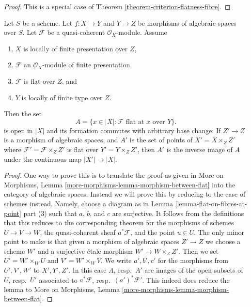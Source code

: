 \begin{proof}
This is a special case of
Theorem \ref{theorem-criterion-flatness-fibre}.
\end{proof}

\begin{lemma}
\label{lemma-base-change-criterion-flatness-fibre}
Let $S$ be a scheme. Let $f : X \to Y$ and $Y \to Z$ be morphisms of
algebraic spaces over $S$. Let $\mathcal{F}$ be a quasi-coherent
$\mathcal{O}_X$-module.
Assume
\begin{enumerate}
\item $X$ is locally of finite presentation over $Z$,
\item $\mathcal{F}$ an $\mathcal{O}_X$-module of finite presentation,
\item $\mathcal{F}$ is flat over $Z$, and
\item $Y$ is locally of finite type over $Z$.
\end{enumerate}
Then the set
$$
A = \{x \in |X| : \mathcal{F} \text{ flat at }x \text{ over }Y\}.
$$
is open in $|X|$ and its formation commutes with arbitrary base change:
If $Z' \to Z$ is a morphism of algebraic spaces, and $A'$ is the set of
points of $X' = X \times_Z Z'$ where $\mathcal{F}' = \mathcal{F} \times_Z Z'$
is flat over $Y' = Y \times_Z Z'$, then $A'$ is the inverse image of
$A$ under the continuous map $|X'| \to |X|$.
\end{lemma}

\begin{proof}
One way to prove this is to translate the proof as given in
More on Morphisms, Lemma \ref{more-morphisms-lemma-morphism-between-flat}
into the category of algebraic spaces. Instead we will prove this
by reducing to the case of schemes instead. Namely, choose a diagram as in
Lemma \ref{lemma-flat-on-fibres-at-point} part (3)
such that $a$, $b$, and $c$ are surjective.
It follows from the definitions that this reduces to the
corresponding theorem for the morphisms of schemes
$U \to V \to W$, the quasi-coherent sheaf $a^*\mathcal{F}$,
and the point $u \in U$. The only minor point to make is that
given a morphism of algebraic spaces $Z' \to Z$ we choose a scheme
$W'$ and a surjective \'etale morphism $W' \to W \times_Z Z'$.
Then we set $U' = W' \times_W U$ and $V' = W' \times_W V$.
We write $a', b', c'$ for the morphisms from $U', V', W'$ to
$X', Y', Z'$. In this case $A$, resp.\ $A'$ are images of the open
subsets of $U$, resp.\ $U'$ associated to
$a^*\mathcal{F}$, resp.\ $(a')^*\mathcal{F}'$.
This indeed does reduce the lemma to
More on Morphisms, Lemma \ref{more-morphisms-lemma-morphism-between-flat}.
\end{proof}

